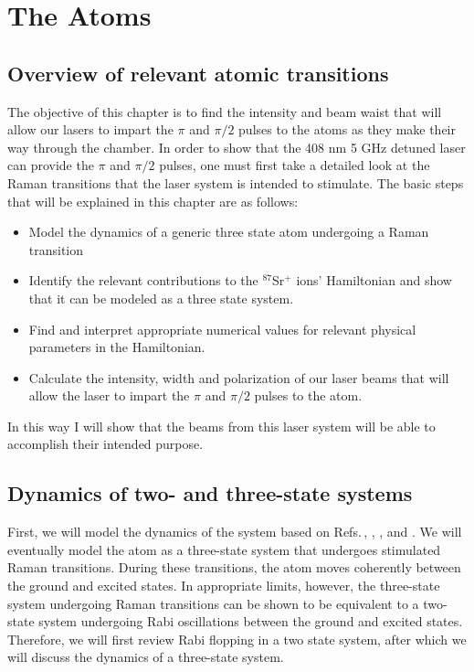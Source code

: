 \chapter{The Atoms} \label{ChapterAboutTheAtoms}
\section{Overview of relevant atomic transitions}

The objective of this chapter is to find the intensity and beam waist that will allow our lasers to impart the $\pi$ and $\pi/2$ pulses to the atoms as they make their way through the chamber. In order to show that the 408 nm 5 GHz detuned laser can provide the $\pi$ and $\pi/2$ pulses, one must first take a detailed look at the Raman transitions that the laser system is intended to stimulate.
The basic steps that will be explained in this chapter are as follows:
\begin{itemize}
\item Model the dynamics of a generic three state atom undergoing a Raman transition
\item Identify the relevant contributions to the $^{87}$Sr$^+$ ions' Hamiltonian and show that it can be modeled as a three state system.
\item Find and interpret appropriate numerical values for relevant physical parameters in the Hamiltonian.
\item Calculate the intensity, width and polarization of our laser beams that will allow the laser to impart the $\pi$ and $\pi/2$ pulses to the atom. 
\end{itemize}
In this way I will show that the beams from this laser system will be able to accomplish their intended purpose.

\section{Dynamics of two- and three-state systems}\label{dynamicsSection}

First, we will model the dynamics of the system based on Refs.\,\cite{Young1997363}, \cite{gustavsonThesis}, \cite{footAtomicPhysics}, \cite{cjeDiss} and \cite{RamanBeamSplit}. 
We will eventually model the atom as a three-state system that undergoes stimulated Raman transitions. During these transitions, the atom moves coherently between the ground and excited states. In appropriate limits, however, the three-state system undergoing Raman transitions can be shown to be equivalent to a two-state system undergoing Rabi oscillations between the ground and excited states. Therefore, we will first review Rabi flopping in a two state system, after which we will discuss the dynamics of a three-state system. 

